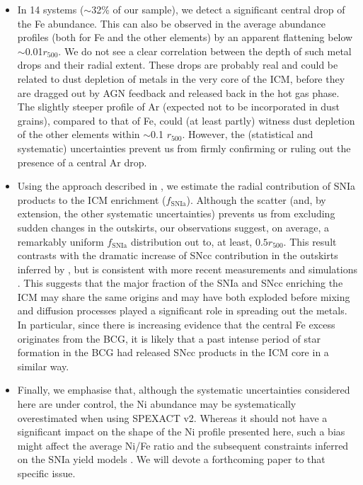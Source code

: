 \documentclass{aa}
\begin{document}
\begin{itemize}
\item In 14 systems ($\sim$32\% of our sample), we detect a significant central drop of the Fe abundance. This can also be observed in the average abundance profiles (both for Fe and the other elements) by an apparent flattening below $\sim$0.01$r_{500}$. We do not see a clear correlation between the depth of such metal drops and their radial extent. These drops are probably real and could be related to dust depletion of metals in the very core of the ICM, before they are dragged out by AGN feedback and released back in the hot gas phase. The slightly steeper profile of Ar (expected not to be incorporated in dust grains), compared to that of Fe, could (at least partly) witness dust depletion of the other elements within $\sim$0.1 $r_{500}$. However, the (statistical and systematic) uncertainties prevent us from firmly confirming or ruling out the presence of a central Ar drop.

\item Using the approach described in \citet{2016A&A...595A.126M}, we estimate the radial contribution of SNIa products to the ICM enrichment ($f_\text{SNIa}$). Although the scatter (and, by extension, the other systematic uncertainties) prevents us from excluding sudden changes in the outskirts, our observations suggest, on average, a remarkably uniform $f_\text{SNIa}$ distribution out to, at least, $0.5 r_{500}$. This result contrasts with the dramatic increase of SNcc contribution in the outskirts inferred by \citet{2009MNRAS.399..239R}, but is consistent with more recent measurements \citep{2015ApJ...811L..25S,2016arXiv160903581E} and simulations \citep{2010MNRAS.401.1670F,2014MNRAS.438..195P,2017arXiv170108164B}. This suggests that the major fraction of the SNIa and SNcc enriching the ICM may share the same origins and may have both exploded before mixing and diffusion processes played a significant role in spreading out the metals. In particular, since there is increasing evidence that the central Fe excess originates from the BCG, it is likely that a past intense period of star formation in the BCG had released SNcc products in the ICM core in a similar way.

\item Finally, we emphasise that, although the systematic uncertainties considered here are under control, the Ni abundance may be systematically overestimated when using SPEXACT v2. Whereas it should not have a significant impact on the shape of the Ni profile presented here, such a bias might affect the average Ni/Fe ratio \citep[e.g.][]{2016A&A...592A.157M} and the subsequent constraints inferred on the SNIa yield models \citep[e.g.][]{2016A&A...595A.126M}. We will devote a forthcoming paper to that specific issue.

\end{itemize}
\end{document}
